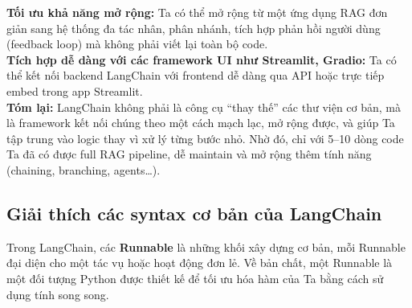 \documentclass[11pt]{article}
\begin{document}
\noindent
\textbf{Tối ưu khả năng mở rộng:}
Ta có thể mở rộng từ một ứng dụng RAG đơn giản sang hệ thống đa tác nhân, phân nhánh, tích hợp phản hồi người dùng (feedback loop) mà không phải viết lại toàn bộ code. \\

\noindent
\textbf{Tích hợp dễ dàng với các framework UI như Streamlit, Gradio:}
Ta có thể kết nối backend LangChain với frontend dễ dàng qua API hoặc trực tiếp embed trong app Streamlit. \\

\noindent
\textbf{Tóm lại:} LangChain không phải là công cụ “thay thế” các thư viện cơ bản, mà là framework kết nối chúng theo một cách mạch lạc, mở rộng được, và giúp Ta tập trung vào logic thay vì xử lý từng bước nhỏ. Nhờ đó, chỉ với 5–10 dòng code Ta đã có được full RAG pipeline, dễ maintain và mở rộng thêm tính năng (chaining, branching, agents…).

\subsection{Giải thích các syntax cơ bản của LangChain}
Trong LangChain, các \textbf{Runnable} là những khối xây dựng cơ bản, mỗi Runnable đại diện cho một tác vụ hoặc hoạt động đơn lẻ. Về bản chất, một Runnable là một đối tượng Python được thiết kế để tối ưu hóa hàm của Ta bằng cách sử dụng tính song song.
\end{document}
